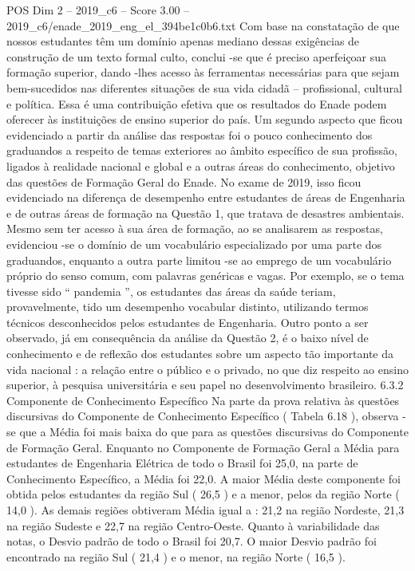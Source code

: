 \begin{textsample}{POS Dim 2 – 2019\_c6 – Score 3.00 – 2019\_c6/enade\_2019\_eng\_el\_394be1c0b6.txt}
Com base na constatação de que nossos estudantes têm um domínio apenas mediano dessas exigências de construção de um texto formal culto, conclui -se que é preciso aperfeiçoar sua formação superior, dando -lhes acesso às ferramentas necessárias para que sejam bem-sucedidos nas diferentes situações de sua vida cidadã – profissional, cultural e política.
Essa é uma contribuição efetiva que os resultados do Enade podem oferecer às instituições de ensino superior do país.
Um segundo aspecto que ficou evidenciado a partir da análise das respostas foi o pouco conhecimento dos graduandos a respeito de temas exteriores ao âmbito específico de sua profissão, ligados à realidade nacional e global e a outras áreas do conhecimento, objetivo das questões de Formação Geral do Enade.
No exame de 2019, isso ficou evidenciado na diferença de desempenho entre estudantes de áreas de Engenharia e de outras áreas de formação na Questão 1, que tratava de desastres ambientais.
Mesmo sem ter acesso à sua área de formação, ao se analisarem as respostas, evidenciou -se o domínio de um vocabulário especializado por uma parte dos graduandos, enquanto a outra parte limitou -se ao emprego de um vocabulário próprio do senso comum, com palavras genéricas e vagas.
Por exemplo, se o tema tivesse sido “ pandemia ”, os estudantes das áreas da saúde teriam, provavelmente, tido um desempenho vocabular distinto, utilizando termos técnicos desconhecidos pelos estudantes de Engenharia.
Outro ponto a ser observado, já em consequência da análise da Questão 2, é o baixo nível de conhecimento e de reflexão dos estudantes sobre um aspecto tão importante da vida nacional : a relação entre o público e o privado, no que diz respeito ao ensino superior, à pesquisa universitária e seu papel no desenvolvimento brasileiro. 6.3.2 Componente de Conhecimento Específico Na parte da prova relativa às questões discursivas do Componente de Conhecimento Específico ( Tabela 6.18 ), observa -se que a Média foi mais baixa do que para as questões discursivas do Componente de Formação Geral.
Enquanto no Componente de Formação Geral a Média para estudantes de Engenharia Elétrica de todo o Brasil foi 25,0, na parte de Conhecimento Específico, a Média foi 22,0.
A maior Média deste componente foi obtida pelos estudantes da região Sul ( 26,5 ) e a menor, pelos da região Norte ( 14,0 ).
As demais regiões obtiveram Média igual a : 21,2 na região Nordeste, 21,3 na região Sudeste e 22,7 na região Centro-Oeste.
Quanto à variabilidade das notas, o Desvio padrão de todo o Brasil foi 20,7.
O maior Desvio padrão foi encontrado na região Sul ( 21,4 ) e o menor, na região Norte ( 16,5 ).

\end{textsample}
